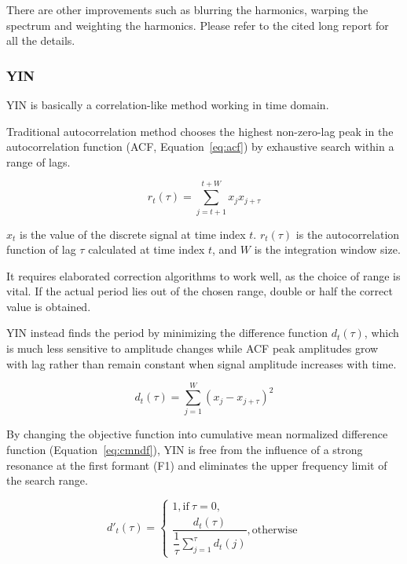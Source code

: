 \documentclass[11pt,a4paper,titlepage]{article}
\begin{document}
There are other improvements such as blurring the harmonics, warping the spectrum and weighting the harmonics.
Please refer to the cited long report for all the details.

\subsubsection{YIN}

YIN is basically a correlation-like method working in time domain.

Traditional autocorrelation method chooses the highest non-zero-lag peak in the autocorrelation function (ACF, Equation~\ref{eq:acf}) by exhaustive search within a range of lags.

\begin{equation} \label{eq:acf}
  r_t (\tau) = \sum_{j=t+1}^{t+W} x_j x_{j+\tau}
\end{equation}

\(x_t\) is the value of the discrete signal at time index \(t\).
\(r_t (\tau)\) is the autocorrelation function of lag \(\tau\) calculated at time index \(t\), and \(W\) is the integration window size.

It requires elaborated correction algorithms to work well, as the choice of range is vital.
If the actual period lies out of the chosen range, double or half the correct value is obtained.

YIN instead finds the period by minimizing the difference function \(d_t (\tau)\), which is much less sensitive to amplitude changes while ACF peak amplitudes grow with lag rather than remain constant when signal amplitude increases with time.

\begin{equation}
  d_t (\tau) = \sum_{j=1}^W (x_j - x_{j+\tau})^2
\end{equation}

By changing the objective function into cumulative mean normalized difference function (Equation~\ref{eq:cmndf}), YIN is free from the influence of a strong resonance at the first formant (F1) and eliminates the upper frequency limit of the search range.

\begin{equation} \label{eq:cmndf}
d'_t (\tau) = \begin{cases}
1, \text{if}\ \tau = 0, \\
\dfrac{d_t (\tau)}{\dfrac{1}{\tau} \sum_{j=1}^{\tau} d_t (j)}, \text{otherwise}
\end{cases}
\end{equation}
\end{document}
